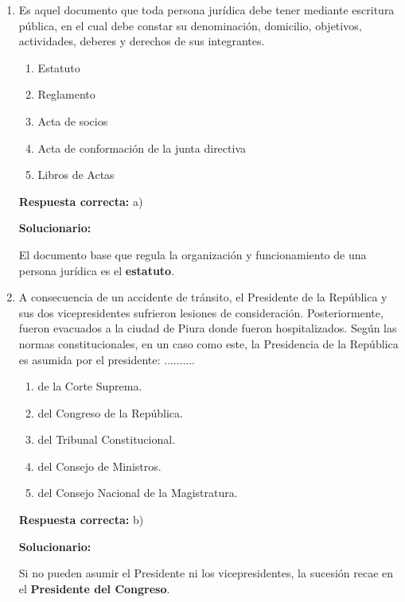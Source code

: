 \begin{enumerate}[resume]


\item  Es aquel documento que toda persona jurídica debe tener mediante escritura pública, en el cual debe constar su denominación, domicilio, objetivos, actividades, deberes y derechos de sus integrantes.
\begin{enumerate}[label=\alph*)]
	\item Estatuto
	\item Reglamento
	\item Acta de socios
	\item Acta de conformación de la junta directiva
	\item Libros de Actas
\end{enumerate}

\textbf{Respuesta correcta:} a)

\vspace{2mm}
\textbf{Solucionario:}

El documento base que regula la organización y funcionamiento de una persona jurídica es el \textbf{estatuto}.

\item  A consecuencia de un accidente de tránsito, el Presidente de la República y sus dos vicepresidentes sufrieron lesiones de consideración. Posteriormente, fueron evacuados a la ciudad de Piura donde fueron hospitalizados. Según las normas constitucionales, en un caso como este, la Presidencia de la República es asumida por el presidente: ..........
\begin{enumerate}[label=\alph*)]
	\item de la Corte Suprema.
	\item del Congreso de la República.
	\item del Tribunal Constitucional.
	\item del Consejo de Ministros.
	\item del Consejo Nacional de la Magistratura.
\end{enumerate}

\textbf{Respuesta correcta:} b)

\vspace{2mm}
\textbf{Solucionario:}

Si no pueden asumir el Presidente ni los vicepresidentes, la sucesión recae en el \textbf{Presidente del Congreso}.

\end{enumerate}






